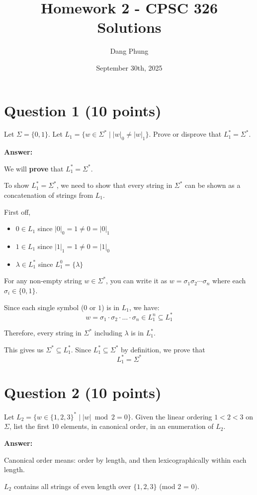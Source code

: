 \documentclass[12pt]{article}
\title{Homework 2 - CPSC 326\\Solutions}
\author{Dang Phung}
\date{September 30th, 2025}
\begin{document}
\maketitle

\section*{Question 1 (10 points)}
Let $\Sigma = \{0, 1\}$. Let $L_1 = \{w \in \Sigma^* \mid |w|_0 \neq |w|_1\}$. Prove or disprove that $L_1^* = \Sigma^*$.

\textbf{Answer:}

We will \textbf{prove} that $L_1^* = \Sigma^*$.

To show $L_1^* = \Sigma^*$, we need to show that every string in $\Sigma^*$ can be shown  as a concatenation of strings from $L_1$.

First off,
\begin{itemize}
    \item $0 \in L_1$ since $|0|_0 = 1 \neq 0 = |0|_1$
    \item $1 \in L_1$ since $|1|_1 = 1 \neq 0 = |1|_0$
    \item $\lambda \in L_1^*$ since $L_1^0 = \{\lambda\}$
\end{itemize}

For any non-empty string $w \in \Sigma^*$, you can write it as $w = \sigma_1\sigma_2\cdots\sigma_n$ where each $\sigma_i \in \{0, 1\}$.

Since each single symbol ($0$ or $1$) is in $L_1$, we have:
$$w = \sigma_1 \cdot \sigma_2 \cdot \ldots \cdot \sigma_n \in L_1^n \subseteq L_1^*$$

Therefore, every string in $\Sigma^*$ including $\lambda$ is in $L_1^*$.

This gives us $\Sigma^* \subseteq L_1^*$. Since $L_1^* \subseteq \Sigma^*$ by definition, we prove that
$$L_1^* = \Sigma^*$$

\section*{Question 2 (10 points)}
Let $L_2 = \{w \in \{1, 2, 3\}^* \mid |w| \bmod 2 = 0\}$. Given the linear ordering $1 < 2 < 3$ on $\Sigma$, list the first 10 elements, in canonical order, in an enumeration of $L_2$.

\textbf{Answer:}

Canonical order means: order by length, and then lexicographically within each length.

$L_2$ contains all strings of even length over $\{1, 2, 3\}$ (mod 2  = 0).
\end{document}
